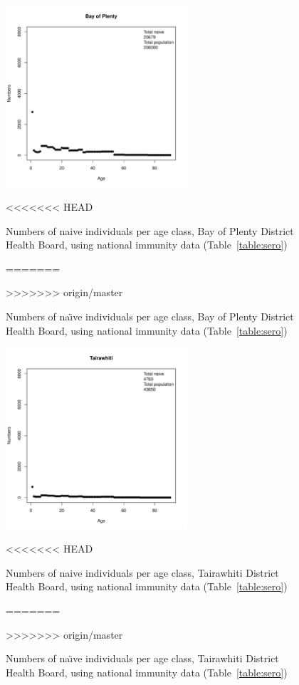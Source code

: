 \documentclass{article}
\begin{document}
\begin{itemize}
\begin{figure}[H]
     \begin{center}
     \includegraphics[width=0.6\textwidth]{dhb7.pdf}
     \end{center}
<<<<<<< HEAD
     \caption{Numbers of naive individuals per age class, Bay of Plenty District Health Board, using national immunity data (Table~\ref{table:sero})}
=======
     \caption{Numbers of na\"{\i}ve individuals per age class, Bay of Plenty District Health Board, using national immunity data (Table~\ref{table:sero})}
>>>>>>> origin/master
     \label{fig:BayofPlenty}
\end{figure}

\begin{figure}[H]
     \begin{center}
     \includegraphics[width=0.6\textwidth]{dhb8.pdf}
     \end{center}
<<<<<<< HEAD
     \caption{Numbers of naive individuals per age class, Tairawhiti District Health Board, using national immunity data (Table~\ref{table:sero})}
=======
     \caption{Numbers of na\"{\i}ve individuals per age class, Tairawhiti District Health Board, using national immunity data (Table~\ref{table:sero})}
>>>>>>> origin/master
     \label{fig:Tairawhiti}
\end{figure}


\end{itemize}
\end{document}
